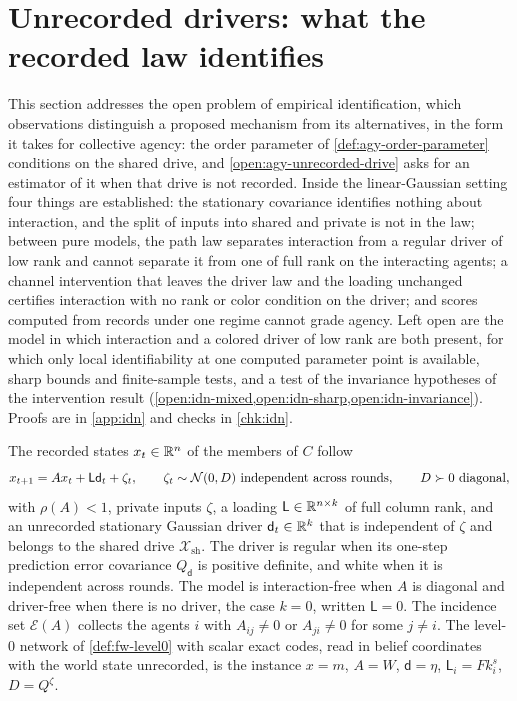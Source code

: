 \section{Unrecorded drivers: what the recorded law identifies}\label{sec:idn}

This section addresses the open problem of empirical identification, which observations distinguish a proposed mechanism from its alternatives, in the form it takes for collective agency: the order parameter of \cref{def:agy-order-parameter} conditions on the shared drive, and \cref{open:agy-unrecorded-drive} asks for an estimator of it when that drive is not recorded. Inside the linear-Gaussian setting four things are established: the stationary covariance identifies nothing about interaction, and the split of inputs into shared and private is not in the law; between pure models, the path law separates interaction from a regular driver of low rank and cannot separate it from one of full rank on the interacting agents; a channel intervention that leaves the driver law and the loading unchanged certifies interaction with no rank or color condition on the driver; and scores computed from records under one regime cannot grade agency. Left open are the model in which interaction and a colored driver of low rank are both present, for which only local identifiability at one computed parameter point is available, sharp bounds and finite-sample tests, and a test of the invariance hypotheses of the intervention result (\cref{open:idn-mixed,open:idn-sharp,open:idn-invariance}). Proofs are in \cref{app:idn} and checks in \cref{chk:idn}.

\begin{definition}\label{def:idn-model}
The recorded states $x_t\in\mathbb{R}^n$ of the members of $C$ follow
\begin{equation}\label{eq:idn-model}
x_{t+1}=Ax_t+\mathsf L\mathsf d_t+\zeta_t,\qquad\zeta_t\sim\Ncal(0,D)\ \text{independent across rounds},\qquad D\succ0\ \text{diagonal},
\end{equation}
with $\rho(A)<1$, private inputs $\zeta$, a loading $\mathsf L\in\mathbb{R}^{n\times k}$ of full column rank, and an unrecorded stationary Gaussian driver $\mathsf d_t\in\mathbb{R}^k$ that is independent of $\zeta$ and belongs to the shared drive $\mathcal X_{\mathrm{sh}}$. The driver is regular when its one-step prediction error covariance $Q_{\mathsf d}$ is positive definite, and white when it is independent across rounds. The model is interaction-free when $A$ is diagonal and driver-free when there is no driver, the case $k=0$, written $\mathsf L=0$. The incidence set $\mathcal E(A)$ collects the agents $i$ with $A_{ij}\neq0$ or $A_{ji}\neq0$ for some $j\neq i$. The level-0 network of \cref{def:fw-level0} with scalar exact codes, read in belief coordinates with the world state unrecorded, is the instance $x=m$, $A=W$, $\mathsf d=\eta$, $\mathsf L_i=Fk^s_i$, $D=Q^\zeta$.
\end{definition}

